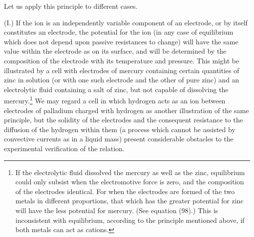 \documentclass[12pt]{article}
\begin{document}
Let us apply this principle to different cases.

(I.) If the ion is an independently variable component of an electrode, or by itself constitutes an electrode, the potential for the ion (in any case of equilibrium which does not depend upon passive resistances to change) will have the same value within the electrode as on its surface, and will be determined by the composition of the electrode with its temperature and pressure. This might be illustrated by a cell with electrodes of mercury containing certain quantities of zinc in solution (or with one such electrode and the other of pure zinc) and an electrolytic fluid containing a salt of zinc, but not capable of dissolving the mercury.\footnote{If the electrolytic fluid dissolved the mercury as well as the zinc, equilibrium could only subsist when the electromotive force is zero, and the composition of the electrodes identical. For when the electrodes are formed of the two metals in different proportions, that which has the greater potential for zinc will have the less potential for mercury. (See equation (98).) This is inconsistent with equilibrium, according to the principle mentioned above, if both metals can act as cations.} We may regard a cell in which hydrogen acts as an ion between electrodes of palladium charged with hydrogen as another illustration of the same principle, but the solidity of the electrodes and the consequent resistance to the diffusion of the hydrogen within them (a process which cannot be assisted by convective currents as in a liquid mass) present considerable obstacles to the experimental verification of the relation.
\end{document}
